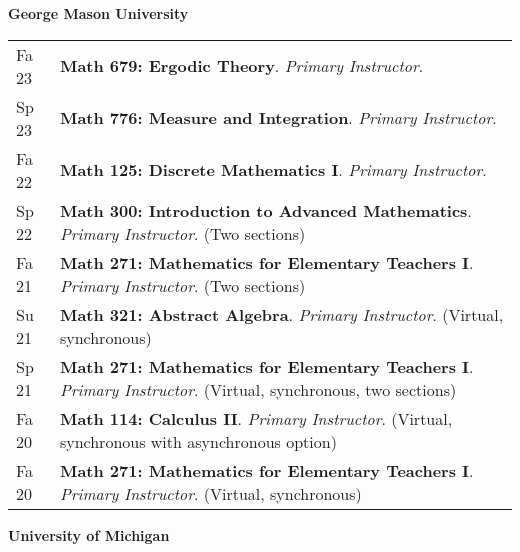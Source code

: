 
    \medskip


    \medskip
    \medskip



    \textbf{\large George Mason University}
    
    \begin{center}
    {
    \renewcommand{\arraystretch}{1.2}
    \begin{longtable}{p{}  p{}}
      Fa 23 & \textbf{{\normalfont Math 679:} Ergodic Theory}. \textit{Primary Instructor}.  \\ 
  Sp 23 & \textbf{{\normalfont Math 776:} Measure and Integration}. \textit{Primary Instructor}.  \\ 
  Fa 22 & \textbf{{\normalfont Math 125:} Discrete Mathematics I}. \textit{Primary Instructor}.  \\ 
  Sp 22 & \textbf{{\normalfont Math 300:} Introduction to Advanced Mathematics}. \textit{Primary Instructor}. (Two sections) \\ 
  Fa 21 & \textbf{{\normalfont Math 271:} Mathematics for Elementary Teachers I}. \textit{Primary Instructor}. (Two sections) \\ 
  Su 21 & \textbf{{\normalfont Math 321:} Abstract Algebra}. \textit{Primary Instructor}. (Virtual, synchronous) \\ 
  Sp 21 & \textbf{{\normalfont Math 271:} Mathematics for Elementary Teachers I}. \textit{Primary Instructor}. (Virtual, synchronous, two sections) \\ 
  Fa 20 & \textbf{{\normalfont Math 114:} Calculus II}. \textit{Primary Instructor}. (Virtual, synchronous with asynchronous option) \\ 
  Fa 20 & \textbf{{\normalfont Math 271:} Mathematics for Elementary Teachers I}. \textit{Primary Instructor}. (Virtual, synchronous) 
    \end{longtable}
    } 
    \end{center}

    \vspace{-1em}
    

    \textbf{\large University of Michigan}
    
